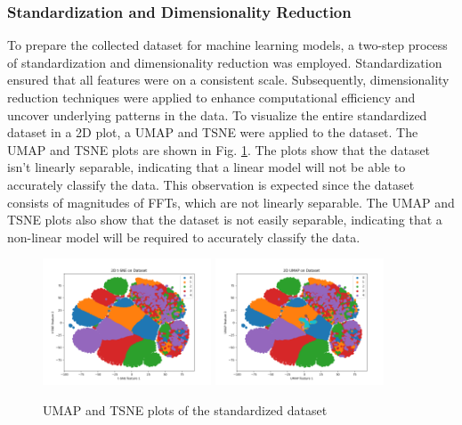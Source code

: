 \documentclass[conference]{IEEEtran}
\begin{document}
\subsubsection{Standardization and Dimensionality Reduction}
To prepare the collected dataset for machine learning models, a two-step process of standardization and dimensionality reduction was employed. Standardization ensured that all features were on a consistent scale. Subsequently, dimensionality reduction techniques were applied to enhance computational efficiency and uncover underlying patterns in the data. To visualize the entire standardized dataset in a 2D plot, a UMAP and TSNE were applied to the dataset. The UMAP and TSNE plots are shown in Fig. \ref{fig3}. The plots show that the dataset isn't linearly separable, indicating that a linear model will not be able to accurately classify the data. This observation is expected since the dataset consists of magnitudes of FFTs, which are not linearly separable. The UMAP and TSNE plots also show that the dataset is not easily separable, indicating that a non-linear model will be required to accurately classify the data.
\begin{figure}[htbp]
    \centering
    \includegraphics[width=5cm]{figs/nn/tsne.png} %
    \includegraphics[width=5cm]{figs/nn/umap.png} %
    \caption{UMAP and TSNE plots of the standardized dataset}
    \label{fig3}
\end{figure}
\end{document}
